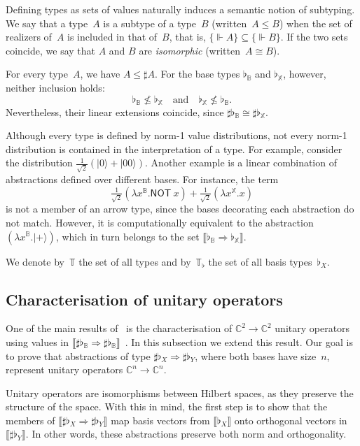 \documentclass[runningheads,orivec,envcountsame,envcountsect]{llncs}
\newcommand\ket[1]{\ensuremath{|#1\rangle}}
\def\C{\mathbb{C}}            %
\def\Lam#1#2#3{\lambda#1^{#2}{.}#3} %
\def\Arr{\Rightarrow}
\def\Type{\mathbb{T}}
\def\BasisType{\Type_\flat}
\def\sem#1{\llbracket#1\rrbracket}
\def\real{\Vdash}
\newcommand\B{\mathbb B}
\newcommand\XB{\mathbb X}
\newcommand{\pauliX}[1]{\mathsf{NOT}\ #1}
\newcommand\basis[1]{\ensuremath{\flat_{#1}}}
\begin{document}
Defining types as sets of values naturally induces a semantic notion of
subtyping. We say that a type~$A$ is a subtype of a type~$B$
(written~$A\leq B$) when the set of realizers of~$A$ is included in that of~$B$,
that is, $\{\real A\}\subseteq\{\real B\}$.
If the two sets coincide, we say that $A$ and $B$ are \emph{isomorphic}
(written~$A\cong B$).

\begin{example}
  For every type~$A$, we have $A\leq\sharp A$.
  For the base types $\basis{\B}$ and $\basis{\XB}$, however,
  neither inclusion holds:
  \[
    \basis{\B}\not\leq\basis{\XB}
    \quad\text{and}\quad
    \basis{\XB}\not\leq\basis{\B}.
  \]
  Nevertheless, their linear extensions coincide,
  since $\sharp\basis{\B}\cong\sharp\basis{\XB}$.
\end{example}

Although every type is defined by norm-1 value distributions, not every
norm-1 distribution is contained in the interpretation of a type.
For example, consider the distribution
$\tfrac{1}{\sqrt{2}}(\ket{0} + \ket{00})$.
Another example is a linear combination of abstractions defined over different
bases. For instance, the term
\[
  \tfrac{1}{\sqrt{2}}(\Lam{x}{{\B}}{\pauliX{x}})
  + \tfrac{1}{\sqrt{2}}(\Lam{x}{{\XB}}{x})
\]
is not a member of an arrow type, since the bases decorating each abstraction
do not match. However, it is computationally equivalent to the abstraction
$(\Lam{x}{{\B}}{\ket{+}})$, which in turn belongs to the set
$\sem{\basis{\B}\Arr\basis{\XB}}$.


We denote by~$\Type$ the set of all types and by~$\BasisType$ the set of all
basis types~$\basis{X}$.

\subsection{Characterisation of unitary operators}


One of the main results of~\cite{DiazcaroGuillermoMiquelValironLICS19}
is the characterisation of $\C^2\to\C^2$ unitary operators using values in
$\sem{\sharp\basis{\B}\Arr\sharp\basis{\B}}$~\cite[Theorem IV.12]{DiazcaroGuillermoMiquelValironLICS19}.
In this subsection we extend this result. Our goal is to prove that abstractions
of type $\sharp\basis{X}\Arr\sharp\basis{Y}$, where both bases have size~$n$,
represent unitary operators
$\C^n\to\C^n$.

Unitary operators are isomorphisms between Hilbert spaces, as they preserve the
structure of the space. With this in mind, the first step is to show that the
members of $\sem{\sharp\basis{X}\Arr\sharp\basis{Y}}$ map basis vectors from
$\sem{\basis{X}}$ onto orthogonal vectors in $\sem{\sharp\basis{Y}}$. In other
words, these abstractions preserve both norm and orthogonality.
\end{document}

